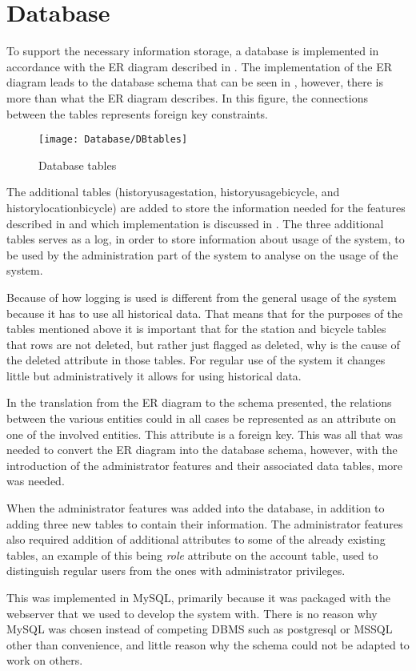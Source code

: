 \section{Database}
To support the necessary information storage, a database is implemented in accordance with the ER diagram described in .
The implementation of the ER diagram leads to the database schema that can be seen in , however, there is more than what the ER diagram describes.
In this figure, the connections between the tables represents foreign key constraints.

\begin{figure}[h]
	\centering
	\texttt{[image: Database/DBtables]}
	\caption{Database tables}\label{fig:Database-tables}
\end{figure}

The additional tables (historyusagestation, historyusagebicycle, and historylocationbicycle) are added to store the information needed for the features described in  and which implementation is discussed in .
The three additional tables serves as a log, in order to store information about usage of the system, to be used by the administration part of the system to analyse on the usage of the system.

Because of how logging is used is different from the general usage of the system because it has to use all historical data.
That means that for the purposes of the tables mentioned above it is important that for the station and bicycle tables that rows are not deleted, but rather just flagged as deleted, why is the cause of the deleted attribute in those tables. 
For regular use of the system it changes little but administratively it allows for using historical data.

In the translation from the ER diagram to the schema presented, the relations between the various entities could in all cases be represented as an attribute on one of the involved entities.
This attribute is a foreign key.
This was all that was needed to convert the ER diagram into the database schema, however, with the introduction of the administrator features and their associated data tables, more was needed.

When the administrator features was added into the database, in addition to adding three new tables to contain their information.
The administrator features also required addition of additional attributes to some of the already existing tables, an example of this being \textit{role} attribute on the account table, used to distinguish regular users from the ones with administrator privileges.

This was implemented in MySQL, primarily because it was packaged with the webserver that we used to develop the system with.
There is no reason why MySQL was chosen instead of competing DBMS such as postgresql or MSSQL other than convenience, and little reason why the schema could not be adapted to work on others.